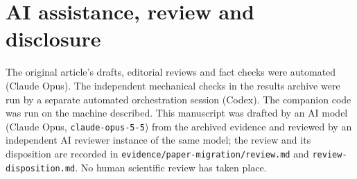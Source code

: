 \documentclass[11pt]{article}
\begin{document}
\section{AI assistance, review and disclosure}\label{sec:disclosure}
The original article's drafts, editorial reviews and fact checks were automated (Claude Opus). The independent
mechanical checks in the results archive were run by a separate automated orchestration session (Codex). The companion
code was run on the machine described. This manuscript was drafted by an AI model (Claude Opus,
\texttt{claude-opus-5-5}) from the archived evidence and reviewed by an independent AI reviewer instance of the same
model; the review and its disposition are recorded in \texttt{evidence/paper-migration/review.md} and
\texttt{review-disposition.md}. No human scientific review has taken place.




\clearpage
\appendix
\end{document}
